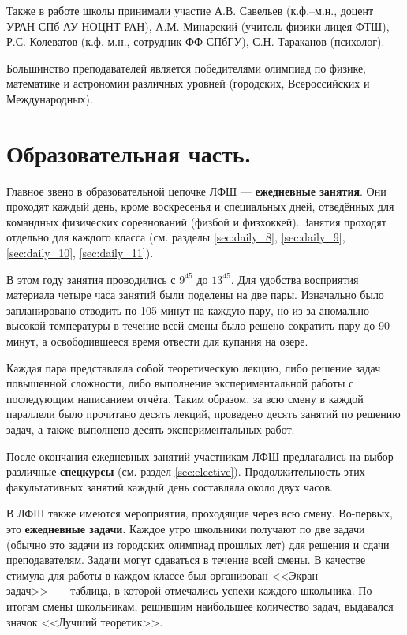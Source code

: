 \documentclass[12pt,a4paper,oneside]{scrartcl}
\begin{document}
Также в работе школы принимали участие А.В. Савельев (к.ф.–м.н.,
доцент УРАН СПб АУ НОЦНТ РАН), А.М. Минарский (учитель физики лицея
ФТШ), Р.С. Колеватов (к.ф.-м.н., сотрудник ФФ СПбГУ), С.Н. Тараканов
(психолог).

Большинство преподавателей является победителями олимпиад по физике,
математике и астрономии различных уровней (городских, Всероссийских и
Международных). 

\section{Образовательная часть.}
\label{sec:science}

Главное звено в образовательной цепочке ЛФШ --- \textbf{ежедневные
занятия}. Они проходят каждый день, кроме воскресенья и специальных
дней, отведённых для командных физических соревнований (физбой и
физхоккей). Занятия проходят отдельно для каждого класса
(см. разделы \ref{sec:daily_8}, \ref{sec:daily_9}, \ref{sec:daily_10},
\ref{sec:daily_11}). 

В этом году занятия проводились с $9^{45}$ до $13^{45}$. Для удобства
восприятия материала четыре часа занятий были поделены на две
пары. Изначально было запланировано отводить по 105 минут на каждую
пару, но из-за аномально высокой температуры в течение всей смены было
решено сократить пару до 90 минут, а освободившееся время отвести для
купания на озере.

Каждая пара представляла собой теоретическую лекцию, либо решение
задач повышенной сложности, либо выполнение экспериментальной работы с
последующим написанием отчёта. Таким образом, за всю смену в каждой
параллели было прочитано десять лекций, проведено десять занятий по
решению задач, а также выполнено десять экспериментальных работ.

После окончания ежедневных занятий участникам ЛФШ предлагались на
выбор различные \textbf{спецкурсы} (см. раздел
\ref{sec:elective}). Продолжительность этих факультативных занятий
каждый день составляла около двух часов. 

В ЛФШ также имеются мероприятия, проходящие через всю
смену. Во-первых, это \textbf{ежедневные задачи}. Каждое утро школьники
получают по две задачи (обычно это задачи из городских олимпиад
прошлых лет) для решения и сдачи преподавателям. Задачи могут
сдаваться в течение всей смены. В качестве стимула для работы в каждом
классе был организован <<Экран задач>>~---~таблица, в которой
отмечались успехи каждого школьника. По итогам смены школьникам,
решившим наибольшее количество задач, выдавался значок <<Лучший
теоретик>>. 
\end{document}
